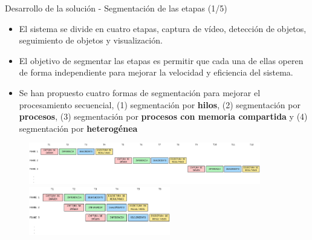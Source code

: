 \documentclass[spanish]{beamer}
\begin{document}
\begin{frame}{Desarrollo de la solución - Segmentación de las etapas (1/5)}
    \begin{itemize}
        \item El sistema se divide en cuatro etapas, captura de vídeo, detección de objetos, seguimiento de objetos y visualización.
        \item El objetivo de segmentar las etapas es permitir que cada una de ellas operen de forma independiente para mejorar la velocidad y eficiencia del sistema.
        \item Se han propuesto cuatro formas de segmentación para mejorar el procesamiento secuencial, (1) segmentación por \textbf{hilos}, (2) segmentación por \textbf{procesos}, (3) segmentación por \textbf{procesos con memoria compartida} y (4) segmentación por \textbf{heterogénea}
    \end{itemize}
    \begin{center}
        \begin{center}
            
            \begin{figure}
                \centering
                \includegraphics[width=0.9\textwidth]{images/solucion_propuesta/secuencial.png}
                \vspace{0.5cm}
                \includegraphics[width=0.55\textwidth]{images/solucion_propuesta/segmentacion.png}
            \end{figure}
        \end{center}
    \end{center}
\end{frame}
\end{document}
